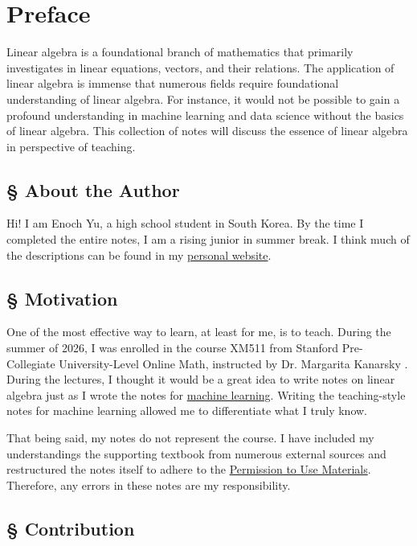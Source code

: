 \documentclass[../main.tex]{subfiles}
\begin{document}
\chapter*{Preface}

Linear algebra is a foundational branch of mathematics that
primarily investigates in linear equations, vectors, and their
relations. The application of linear algebra is immense that
numerous fields require foundational understanding of linear
algebra. For instance, it would not be possible to gain a
profound understanding in machine learning and data science
without the basics of linear algebra. This collection of notes
will discuss the essence of linear algebra in perspective of
teaching.

\section*{\S\! About the Author}

Hi! I am Enoch Yu, a high school student in South Korea. By the
time I completed the entire notes, I am a rising junior in summer
break. I think much of the descriptions can be found in my
\href{https://enochyu.com}{personal website}.

\section*{\S\! Motivation}

One of the most effective way to learn, at least for me, is to
teach. During the summer of 2026, I was enrolled in the course
XM511 from Stanford Pre-Collegiate University-Level Online Math,
instructed by Dr. Margarita Kanarsky \cite{course}. During the
lectures, I thought it would be a great idea to write notes on linear
algebra just as I wrote the notes for \href{null}{machine learning}.
Writing the teaching-style notes for machine learning allowed
me to differentiate what I truly know.

That being said, my notes do not represent the course. I have
included my understandings the supporting textbook \cite{textbook}
from numerous external sources and restructured the notes itself to
adhere to the \href{https://www.stanford.edu/site/terms/}{Permission
to Use Materials}. Therefore, any errors in these notes are my
responsibility.

\section*{\S\! Contribution}
\end{document}
